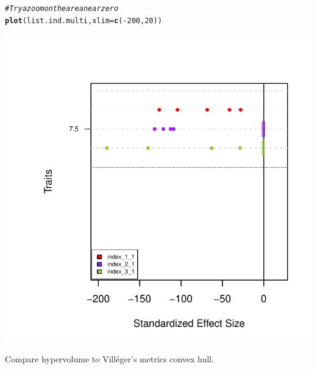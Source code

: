\documentclass[12pt]{article}\usepackage[]{graphicx}\usepackage[]{color}
\makeatletter
\def\maxwidth{ %
  \ifdim\Gin@nat@width>\linewidth
    \linewidth
  \else
    \Gin@nat@width
  \fi
}
\newcommand{\hlnum}[1]{\textcolor[rgb]{0.686,0.059,0.569}{#1}}%
\newcommand{\hlcom}[1]{\textcolor[rgb]{0.678,0.584,0.686}{\textit{#1}}}%
\newcommand{\hlopt}[1]{\textcolor[rgb]{0,0,0}{#1}}%
\newcommand{\hlstd}[1]{\textcolor[rgb]{0.345,0.345,0.345}{#1}}%
\newcommand{\hlkwc}[1]{\textcolor[rgb]{0.333,0.667,0.333}{#1}}%
\newcommand{\hlkwd}[1]{\textcolor[rgb]{0.737,0.353,0.396}{\textbf{#1}}}%
\newenvironment{kframe}{%
 \def\at@end@of@kframe{}%
 \ifinner\ifhmode%
  \def\at@end@of@kframe{\end{minipage}}%
  \begin{minipage}{\columnwidth}%
 \fi\fi%
 \def\FrameCommand##1{\hskip\@totalleftmargin \hskip-\fboxsep
 \colorbox{shadecolor}{##1}\hskip-\fboxsep
     \hskip-\linewidth \hskip-\@totalleftmargin \hskip\columnwidth}%
 \MakeFramed {\advance\hsize-\width
   \@totalleftmargin\z@ \linewidth\hsize
   \@setminipage}}%
 {\par\unskip\endMakeFramed%
 \at@end@of@kframe}
\newenvironment{knitrout}{}{} %
\makeatother
\begin{document}
\begin{knitrout}
{}


\begin{kframe}\begin{alltt}
\hlcom{#Try a zoom on the area near zero}
\hlkwd{plot}\hlstd{(list.ind.multi,} \hlkwc{xlim} \hlstd{=} \hlkwd{c}\hlstd{(}\hlopt{-}\hlnum{200}\hlstd{,}\hlnum{20}\hlstd{))}
\end{alltt}
\end{kframe}

{\centering \includegraphics[width=\maxwidth]{figure/unnamed-chunk-582} 

}



\end{knitrout}

Compare hypervolume to Villéger's metrics convex hull.
\end{document}

